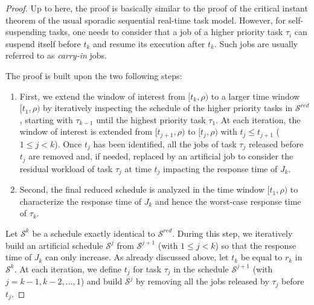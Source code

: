 \begin{proof}
Up to here, the proof is basically similar to the proof of the critical instant theorem of the usual sporadic sequential real-time task model. However, for self-suspending tasks, one needs to consider that a job of a higher priority task $\tau_i$ can suspend itself before $t_k$ and resume its execution after $t_k$. Such jobs are usually referred to as \emph{carry-in} jobs. %

The proof is built upon the two following steps:
\begin{enumerate}
\item First, we extend the window of interest from $[t_k, \rho)$ to a larger time window $[t_1, \rho)$ by iteratively inspecting the schedule of the higher priority tasks in $\mathcal{S}^{red}$, starting with $\tau_{k-1}$ until the highest priority task $\tau_1$. At each iteration, the window of interest is extended from $[t_{j+1}, \rho)$ to $[t_{j}, \rho)$ with $t_j \leq t_{j+1}$ ($1 \leq j < k$). Once $t_j$ has been identified, all the jobs of task $\tau_j$ released before $t_j$ are removed and, if needed, replaced by an artificial job to consider the residual workload of task $\tau_j$ at time $t_j$ impacting the response time of $J_{k}$. 
\item Second, the final reduced schedule is analyzed in the time window $[t_1, \rho)$ to characterize the response time of $J_{k}$ and hence the worst-case response time of $\tau_k$.
\end{enumerate}


Let $\mathcal{S}^k$ be a schedule exactly identical to $\mathcal{S}^{red}$. During this step, we iteratively build an artificial schedule $\mathcal{S}^j$ from $\mathcal{S}^{j+1}$ (with $1 \leq j < k$) so that the response time of $J_{k}$ can only increase. As already discussed above, let $t_k$ be equal to $r_k$ in $\mathcal{S}^k$. At each iteration, we define $t_j$ for task $\tau_j$ in the schedule $\mathcal{S}^{j+1}$ (with $j=k-1, k-2, \ldots, 1$) and build $\mathcal{S}^j$ by removing all the jobs released by $\tau_j$ before $t_j$.



\end{proof}
